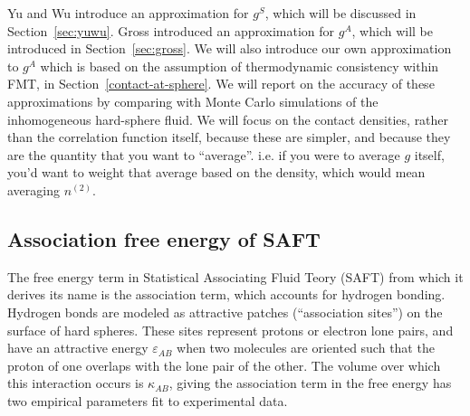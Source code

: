 \documentclass[letterpaper,twocolumn,amsmath,amssymb,jcp,10pt,aip]{revtex4-1}
\begin{document}
Yu and Wu introduce an approximation for
$g^S$\cite{yu2002fmt-dft-inhomogeneous-associating}, which will be
discussed in Section~\ref{sec:yuwu}.  Gross introduced an
approximation for $g^A$\cite{gross2009density}, which will be
introduced in Section~\ref{sec:gross}.  We will also introduce our own
approximation to $g^A$ which is based on the assumption of
thermodynamic consistency within FMT, in
Section~\ref{contact-at-sphere}.  We will report on the accuracy of
these approximations by comparing with Monte Carlo simulations of the
inhomogeneous hard-sphere fluid.  We will focus on the contact
densities, rather than the correlation function itself, because these
are simpler, and because they are the quantity that you want to
``average''.  i.e. if you were to average $g$ itself, you'd want to
weight that average based on the density, which would mean averaging
$n^{(2)}$.


\subsection{Association free energy of SAFT}
\newcommand\epsilonassoc{\ensuremath{\varepsilon_\textit{AB}}}
\newcommand\kappaassoc{\ensuremath{\kappa_\textit{AB}}}
\newcommand\ncontact{\ensuremath{n_\textit{contact}}}

The free energy term in Statistical Associating Fluid Teory (SAFT)
from which it derives its name is the association term, which accounts
for hydrogen bonding.  Hydrogen bonds are modeled as attractive
patches (``association sites'') on the surface of hard spheres.  These
sites represent protons or electron lone pairs, and have an attractive
energy $\epsilonassoc$ when two molecules are oriented such that the
proton of one overlaps with the lone pair of the other.  The volume
over which this interaction occurs is $\kappaassoc$, giving the
association term in the free energy has two empirical parameters fit
to experimental data.
\end{document}
